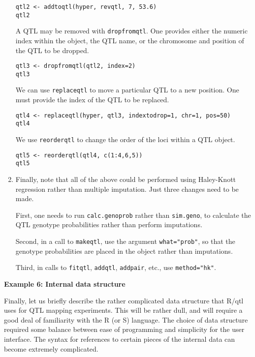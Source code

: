 \documentclass[10pt,letterpaper]{article}
\newcommand{\usercolor}{\color [named]{BlueViolet}}
\begin{document}
\begin{enumerate}
\usercolor
\verb|qtl2 <- addtoqtl(hyper, revqtl, 7, 53.6)| \\
\verb|qtl2|
\normalcolor

  A QTL may be removed with \verb-dropfromqtl-.  One provides either
  the numeric index within the object, the QTL name, or the chromosome and
  position of the QTL to be dropped.

\usercolor
\verb|qtl3 <- dropfromqtl(qtl2, index=2)| \\
\verb|qtl3|
\normalcolor

  We can use \verb-replaceqtl- to move a particular QTL to a new
  position.  One must provide the index of the QTL to be replaced.

\usercolor
\verb|qtl4 <- replaceqtl(hyper, qtl3, indextodrop=1, chr=1, pos=50)|
\\
\verb|qtl4|
\normalcolor

  We use \verb-reorderqtl- to change the order of the loci within a
  QTL object.

\usercolor
\verb|qtl5 <- reorderqtl(qtl4, c(1:4,6,5))| \\
\verb|qtl5|
\normalcolor

\item Finally, note that all of the above could be performed using
  Haley-Knott regression rather than multiple imputation.  Just three
  changes need to be made.  

  First, one needs to run
  \verb-calc.genoprob- rather than \verb-sim.geno-, to calculate the
  QTL genotype probabilities rather than perform imputations.

  Second, in a call to \verb-makeqtl-, use the argument
  \verb-what="prob"-, so that the genotype probabilities are placed in
  the object rather than imputations.

  Third, in calls to \verb-fitqtl-, \verb-addqtl-, \verb-addpair-,
  etc., use \verb-method="hk"-.

\end{enumerate}




\newpage
\noindent \textbf{Example 6: Internal data structure} \vspace{6pt}
\nopagebreak

\label{example6}

\noindent Finally, let us briefly describe the rather complicated data
structure that R/qtl uses for QTL mapping experiments.  This will be
rather dull, and will require a good deal of familiarity with the R
(or S) language.  The choice of data structure required some balance
between ease of programming and simplicity for the user interface.
The syntax for references to certain pieces of the internal data can
become extremely complicated.
\end{document}
